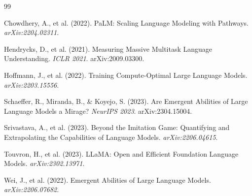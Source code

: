 \documentclass[11pt,a4paper]{article}
\begin{document}

\begin{thebibliography}{99}

Chowdhery, A., et al. (2022).
\newblock PaLM: Scaling Language Modeling with Pathways.
\newblock \emph{arXiv:2204.02311}.

Hendrycks, D., et al. (2021).
\newblock Measuring Massive Multitask Language Understanding.
\newblock \emph{ICLR 2021}. arXiv:2009.03300.

Hoffmann, J., et al. (2022).
\newblock Training Compute-Optimal Large Language Models.
\newblock \emph{arXiv:2203.15556}.

Schaeffer, R., Miranda, B., \& Koyejo, S. (2023).
\newblock Are Emergent Abilities of Large Language Models a Mirage?
\newblock \emph{NeurIPS 2023}. arXiv:2304.15004.

Srivastava, A., et al. (2023).
\newblock Beyond the Imitation Game: Quantifying and Extrapolating the Capabilities of Language Models.
\newblock \emph{arXiv:2206.04615}.

Touvron, H., et al. (2023).
\newblock LLaMA: Open and Efficient Foundation Language Models.
\newblock \emph{arXiv:2302.13971}.

Wei, J., et al. (2022).
\newblock Emergent Abilities of Large Language Models.
\newblock \emph{arXiv:2206.07682}.

\end{thebibliography}
\end{document}
